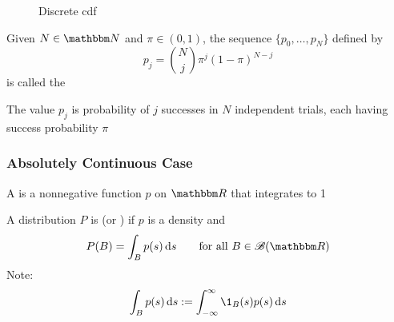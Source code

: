 \begin{frame}

    \begin{figure}
       \begin{center}
        
        \caption{\label{f:discrete_cdf} Discrete {\sc cdf}}
       \end{center}
    \end{figure}

\end{frame}

\begin{frame}

    \vspace{2em}
    \Eg
    Given $N \in \NN$ and $\pi \in (0, 1)$, the sequence $\{p_0, \ldots,
    p_N\}$ defined by
    $$
        p_j = {N\choose j}\pi^j(1-\pi)^{N-j}
    $$ 
    is called the 
    
    The
    value $p_j$ is probability of $j$ successes in $N$ independent
    trials, each having success probability $\pi$

\end{frame}

\begin{frame}\frametitle{Absolutely Continuous Case}
    
    \vspace{2em}
    A  is a nonnegative function $p$ on $\RR$ that integrates to 1
    
    \vspace{.7em}
    A distribution $P$ is  (or ) 
    if $p$ is a density and 
    \begin{equation*}
        \label{eq:drbd}
        P(B) = \int_B p(s) \diff s
        \qquad \text{for all } B \in \bB(\RR)
    \end{equation*}
    Note: 
    \begin{equation*}
        \int_B p(s) \diff s := \int_{-\infty}^\infty \1_B(s) p(s) \diff s
    \end{equation*}
    
\end{frame}

